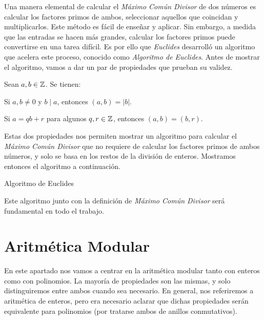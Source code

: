 Una manera elemental de calcular el \textit{Máximo Común Divisor} de dos números es calcular los factores primos de ambos, seleccionar aquellos que coincidan y multiplicarlos. Este método es fácil de enseñar y aplicar. Sin embargo, a medida que las entradas se hacen más grandes, calcular los factores primos puede convertirse en una tarea difícil. Es por ello que \textit{Euclides} desarrolló un algoritmo que acelera este proceso, conocido como \textit{Algoritmo de Euclides}. Antes de mostrar el algoritmo, vamos a dar un par de propiedades que prueban su validez.

\begin{proposicion}
	Sean $a, b \in \mathbb{Z}$. Se tienen:
	
	\item Si $a, b \neq 0$ y $b \mid a$, entonces $(a, b) = |b|$.
	
	\item Si $a = qb + r$ para algunos $q, r \in \mathbb{Z}$, entonces $(a, b) = (b, r)$.
\end{proposicion}

Estas dos propiedades nos permiten mostrar un algoritmo para calcular el \textit{Máximo Común Divisor} que no requiere de calcular los factores primos de ambos números, y solo se basa en los restos de la división de enteros. Mostramos entonces el algoritmo a continuación.

\begin{algorithm}[H]
	\caption{Algoritmo de Euclides}\label{algoritmo_de_euclides}
	\begin{algorithmic}[1]
				\State {}
			\EndIf
				\State {}
			\EndIf
				\State {}
			\EndIf
			\State {}
		\EndProcedure
	\end{algorithmic}
\end{algorithm}

Este algoritmo junto con la definición de \textit{Máximo Común Divisor} será fundamental en todo el trabajo.

\section{Aritmética Modular}

En este apartado nos vamos a centrar en la aritmética modular tanto con enteros como con polinomios. La mayoría de propiedades son las mismas, y solo distinguiremos entre ambos cuando sea necesario. En general, nos referiremos a aritmética de enteros, pero era necesario aclarar que dichas propiedades serán equivalente para polinomios (por tratarse ambos de anillos conmutativos).\\

